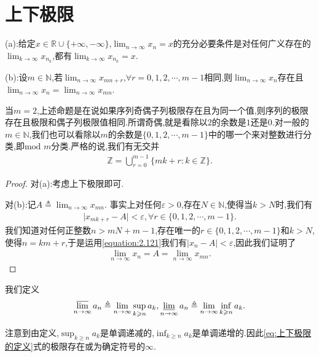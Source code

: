 \documentclass[../../main.tex]{subfiles}%
\begin{document}
\section{上下极限}

\begin{proposition}[子列极限命题]\label{proposition:子列极限命题}
(a):给定\(x \in \mathbb{R} \cup \{+\infty, -\infty\}\),\(\lim_{n \to \infty} x_n = x\)的充分必要条件是对任何广义存在的\(\lim_{k \to \infty} x_{n_k}\),都有\(\lim_{k \to \infty} x_{n_k} = x\).

(b):设\(m \in \mathbb{N}\),若\(\lim_{n \to \infty} x_{mn + r}\),\(\forall r = 0,1,2,\cdots,m - 1\)相同,则\(\lim_{n \to \infty} x_n\)存在且
\(\lim_{n \to \infty} x_n = \lim_{n \to \infty} x_{mn}\).
\end{proposition}
\begin{note}
当\(m = 2\),上述命题是在说如果序列奇偶子列极限存在且为同一个值,则序列的极限存在且极限和偶子列极限值相同.所谓奇偶,就是看除以\(2\)的余数是\(1\)还是\(0\).对一般的\(m \in \mathbb{N}\),我们也可以看除以\(m\)的余数是\(\{0,1,2,\cdots,m - 1\}\)中的哪一个来对整数进行分类,即\(\text{mod } m\)分类.严格的说,我们有无交并
\begin{align*}
\mathbb{Z} = \bigcup_{r = 0}^{m - 1} \{mk + r : k \in \mathbb{Z}\}.
\end{align*}
\end{note}
\begin{proof}

对(a):考虑上下极限即可.

对(b):记\(A \triangleq \lim_{n \to \infty} x_{mn}\).
事实上对任何\(\varepsilon > 0\),存在\(N \in \mathbb{N}\),使得当\(k > N\)时,我们有
\begin{align}\label{equation:2.121}
\vert x_{mk + r} - A \vert < \varepsilon, \forall r \in \{0,1,2,\cdots,m - 1\}.
\end{align}
我们知道对任何正整数\(n > mN + m - 1\),存在唯一的\(r \in \{0,1,2,\cdots,m - 1\}\)和\(k > N\),使得\(n = km + r\),于是运用\eqref{equation:2.121}我们有\(\vert x_n - A \vert < \varepsilon\),因此我们证明了
\begin{align*}
\lim_{n \to \infty} x_n = A = \lim_{n \to \infty} x_{mn} .
\end{align*}

\end{proof}

\begin{definition}[上下极限的定义]\label{theorem:上下极限的定义}
我们定义
\begin{align}\label{eq:上下极限的定义}
\varlimsup_{n \to \infty} a_n \triangleq \lim_{n \to \infty} \sup_{k \geqslant  n} a_k, \varliminf_{n \to \infty} a_n \triangleq \lim_{n \to \infty} \inf_{k \geqslant  n} a_k. 
\end{align}
\end{definition}
\begin{note}
注意到由定义,\(\sup_{k \geqslant  n} a_k\)是单调递减的,\(\inf_{k \geqslant  n} a_k\)是单调递增的.因此\eqref{eq:上下极限的定义}式的极限存在或为确定符号的\(\infty\).
\end{note}
\end{document}
